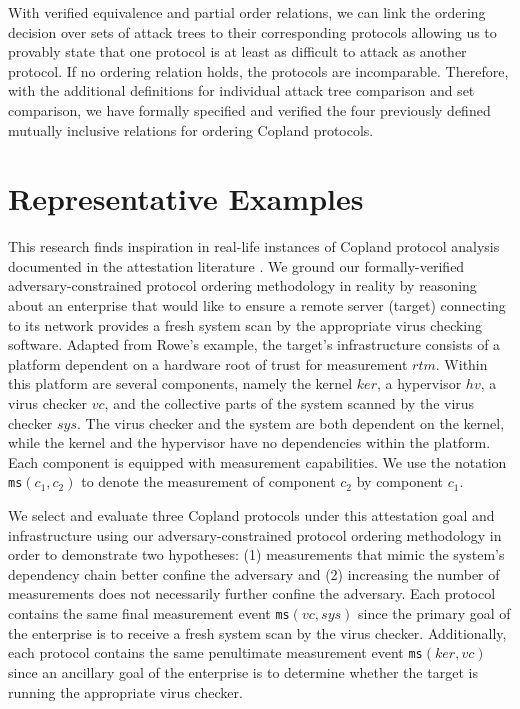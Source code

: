 \documentclass[runningheads]{llncs}
\theoremstyle{definition}
\begin{document}
With verified equivalence and partial order relations, we can link the ordering decision over sets of attack trees to their corresponding protocols allowing us to provably state that one protocol is at least as difficult to attack as another protocol. If no ordering relation holds, the protocols are incomparable. Therefore, with the additional definitions for individual attack tree comparison and set comparison, we have formally specified and verified the four previously defined mutually inclusive relations for ordering Copland protocols. 

\section{Representative Examples}

This research finds inspiration in real-life instances of Copland protocol analysis documented in the attestation literature \cite{Rowe:2021:OnOrdering,Coker::Principles-of-R}. We ground our formally-verified adversary-constrained protocol ordering methodology in reality by reasoning about an enterprise that would like to ensure a remote server (target) connecting to its network provides a fresh system scan by the appropriate virus checking software. Adapted from Rowe's \cite{Rowe:2016:Confining} example, the target's infrastructure consists of a platform dependent on a hardware root of trust for measurement $rtm$. Within this platform are several components, namely the kernel $ker$, a hypervisor $hv$, a virus checker $vc$, and the collective parts of the system scanned by the virus checker $sys$. The virus checker and the system are both dependent on the kernel, while the kernel and the hypervisor have no dependencies within the platform. Each component is equipped with measurement capabilities. We use the notation \texttt{ms}$(c_1,c_2)$ to denote the measurement of component $c_2$ by component $c_1$.

We select and evaluate three Copland protocols under this attestation goal and infrastructure using our adversary-constrained protocol ordering methodology in order to demonstrate two hypotheses: (1) measurements that mimic the system's dependency chain better confine the adversary and (2) increasing the number of measurements does not necessarily further confine the adversary. Each protocol contains the same final measurement event \texttt{ms}$(vc,sys)$ since the primary goal of the enterprise is to receive a fresh system scan by the virus checker. Additionally, each protocol contains the same penultimate measurement event \texttt{ms}$(ker,vc)$ since an ancillary goal of the enterprise is to determine whether the target is running the appropriate virus checker.
\end{document}
